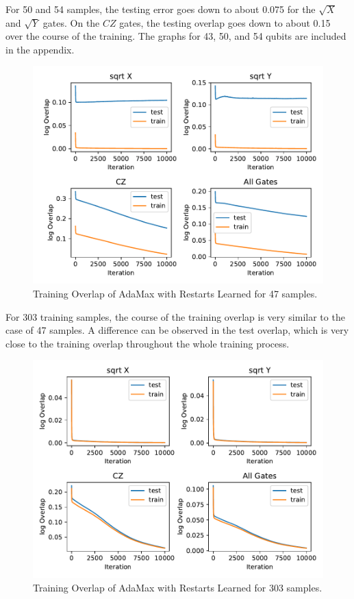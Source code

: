 For 50 and 54 samples, the testing error goes down to about 0.075 for the $\sqrt{X}$ and $\sqrt{Y}$ gates. 
On the $CZ$ gates, the testing overlap goes down to about 0.15 over the course of the training. The graphs 
for 43, 50, and 54 qubits are included in the appendix.

\begin{figure}[H]
  \centering
  \includegraphics[width=\textwidth]{figures/results/AM-restarts-learned/avgOverlap_47.pdf}
  \caption[Training Overlap of AdaMax with Restarts Learned]{Training 
  Overlap of AdaMax with Restarts Learned for 47 samples.}
  \label{fig:sr_tvd}
\end{figure}

For 303 training samples, the course of the training overlap is very similar to the case of 47 samples.
A difference can be observed in the test overlap, which is very close to the training overlap 
throughout the whole training process.

\begin{figure}[H]
  \centering
  \includegraphics[width=\textwidth]{figures/results/AM-restarts-learned/avgOverlap_303.pdf}
  \caption[Training Overlap of AdaMax with Restarts Learned]{Training 
  Overlap of AdaMax with Restarts Learned for 303 samples.}
  \label{fig:sr_tvd}
\end{figure}
